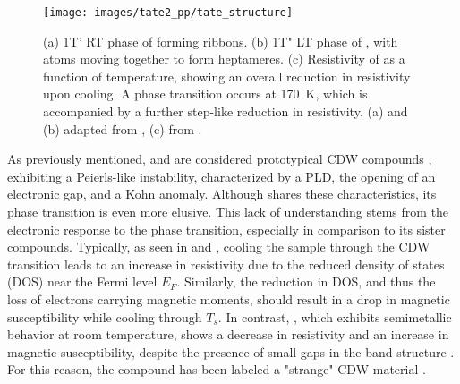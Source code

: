 \begin{figure}[t]
	\centering
	\texttt{[image: images/tate2\_pp/tate\_structure]}
	\caption{(a) 1T' RT phase of  forming ribbons. (b) 1T" LT phase of , with  atoms moving together to form heptameres. (c) Resistivity of  as a function of temperature, showing an overall reduction in resistivity upon cooling. A phase transition occurs at \qty{170}{\kelvin}, which is accompanied by a further step-like reduction in resistivity. (a) and (b) adapted from \cite{lin_evidence_2022}, (c) from \cite{hu_optical_2022}.}
	\label{fig:tate_structure}
\end{figure}


As previously mentioned,  and  are considered prototypical CDW compounds \cite{bozin_crystallization_2023, shen_precursor_2023}, exhibiting a Peierls-like instability, characterized by a PLD, the opening of an electronic gap, and a Kohn anomaly.
Although  shares these characteristics, its phase transition is even more elusive.
This lack of understanding stems from the electronic response to the phase transition, especially in comparison to its  sister compounds.
Typically, as seen in  and , cooling the sample through the CDW transition leads to an increase in resistivity due to the reduced density of states (DOS) near the Fermi level $E_F$.
Similarly, the reduction in DOS, and thus the loss of electrons carrying magnetic moments, should result in a drop in magnetic susceptibility while cooling through $T_s$.
In contrast, , which exhibits semimetallic behavior at room temperature, shows a decrease in resistivity and an increase in magnetic susceptibility, despite the presence of small gaps in the band structure \cite{sorgel_new_2006,hu_optical_2022,lin_evidence_2022}.
For this reason, the compound has been labeled a "strange" CDW material \cite{lin_evidence_2022}.

